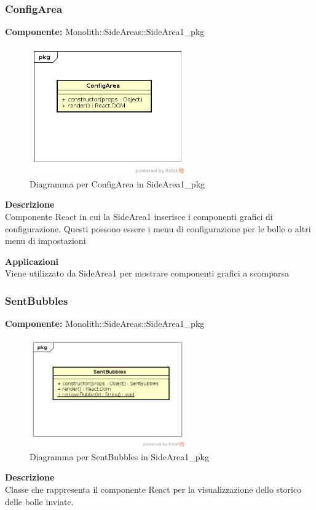 \subsubsection{ConfigArea}
\textbf{Componente:}  Monolith::SideAreas::SideArea1\_pkg\\
   \FloatBarrier
   \begin{figure}[ht]
   \centering
   \includegraphics[width=0.6\textwidth]{img/single-ConfigArea.png}
   \caption{{Diagramma per ConfigArea in SideArea1\_pkg}}
\end{figure}
\FloatBarrier
\textbf{Descrizione}\\
Componente React in cui la SideArea1 inserisce i componenti grafici di configurazione. Questi possono essere i menu di configurazione per le bolle o altri menu di impostazioni 


\textbf{Applicazioni}\\
Viene utilizzato da SideArea1 per mostrare componenti grafici a scomparsa 


\clearpage

\subsubsection{SentBubbles}
\textbf{Componente:}  Monolith::SideAreas::SideArea1\_pkg\\
   \FloatBarrier
   \begin{figure}[ht]
   \centering
   \includegraphics[width=0.6\textwidth]{img/single-SentBubble.png}
   \caption{{Diagramma per SentBubbles in SideArea1\_pkg}}
\end{figure}
\FloatBarrier
\textbf{Descrizione}\\
Classe che rappresenta il componente React per la visualizzazione dello storico delle bolle inviate.

